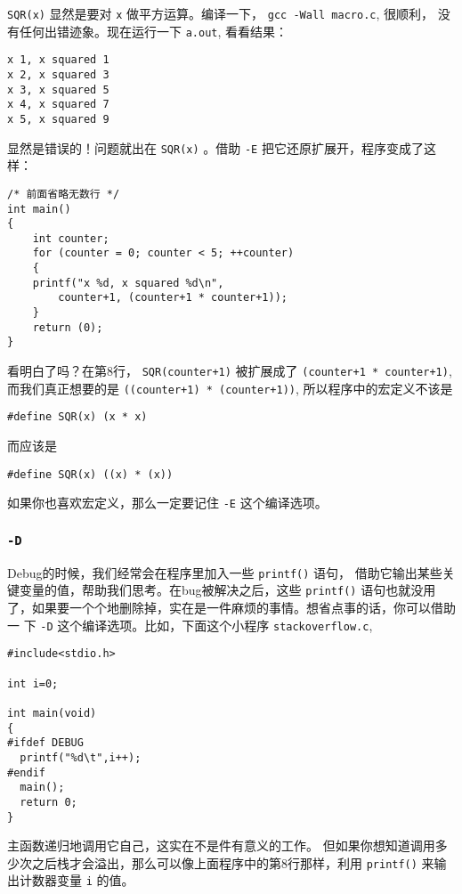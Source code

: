 \documentclass{wx672article}
\begin{document}
\texttt{SQR(x)} 显然是要对 \texttt{x} 做平方运算。编译一下， \texttt{gcc -Wall macro.c}, 很顺利，
没有任何出错迹象。现在运行一下 \texttt{a.out}, 看看结果：
\begin{verbatim}
x 1, x squared 1
x 2, x squared 3
x 3, x squared 5
x 4, x squared 7
x 5, x squared 9
\end{verbatim}
显然是错误的！问题就出在 \texttt{SQR(x)} 。借助 \texttt{-E} 把它还原扩展开，程序变成了这样：
\begin{verbatim}
/* 前面省略无数行 */
int main()
{
    int counter;
    for (counter = 0; counter < 5; ++counter)
    {
	printf("x %d, x squared %d\n",
	    counter+1, (counter+1 * counter+1));
    }
    return (0);
}
\end{verbatim}
看明白了吗？在第8行， \texttt{SQR(counter+1)} 被扩展成了 \texttt{(counter+1 * counter+1)},
而我们真正想要的是 \texttt{((counter+1) * (counter+1))}, 所以程序中的宏定义不该是
\begin{verbatim}
#define SQR(x) (x * x)
\end{verbatim}
而应该是
\begin{verbatim}
#define SQR(x) ((x) * (x))
\end{verbatim}
如果你也喜欢宏定义，那么一定要记住 \texttt{-E} 这个编译选项。

\subsubsection{\texttt{-D}}

Debug的时候，我们经常会在程序里加入一些 \texttt{printf()} 语句，
借助它输出某些关键变量的值，帮助我们思考。在bug被解决之后，这些 \texttt{printf()}
语句也就没用了，如果要一个个地删除掉，实在是一件麻烦的事情。想省点事的话，你可以借助一
下 \texttt{-D} 这个编译选项。比如，下面这个小程序 \texttt{stackoverflow.c},

\begin{verbatim}
#include<stdio.h>

int i=0;

int main(void)
{
#ifdef DEBUG     
  printf("%d\t",i++);
#endif   
  main();
  return 0;
}
\end{verbatim}

主函数递归地调用它自己，这实在不是件有意义的工作。
但如果你想知道调用多少次之后栈才会溢出，那么可以像上面程序中的第8行那样，利用
\texttt{printf()} 来输出计数器变量 \texttt{i} 的值。
\end{document}
